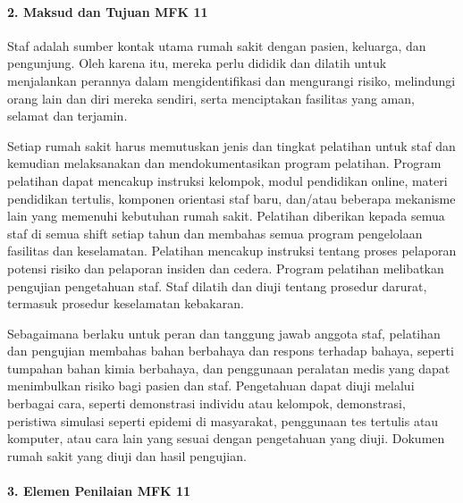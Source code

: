 \documentclass[
]{book}
\begin{document}
\hypertarget{maksud-dan-tujuan-mfk-11}{%
\paragraph*{2. Maksud dan Tujuan MFK 11}\label{maksud-dan-tujuan-mfk-11}}

Staf adalah sumber kontak utama rumah sakit dengan pasien, keluarga, dan pengunjung. Oleh karena itu, mereka perlu dididik dan dilatih untuk menjalankan perannya dalam mengidentifikasi dan mengurangi risiko, melindungi orang lain dan diri mereka sendiri, serta menciptakan fasilitas yang aman, selamat dan terjamin.

Setiap rumah sakit harus memutuskan jenis dan tingkat pelatihan untuk staf dan kemudian melaksanakan dan mendokumentasikan program pelatihan. Program pelatihan dapat mencakup instruksi kelompok, modul pendidikan online, materi pendidikan tertulis, komponen orientasi staf baru, dan/atau beberapa mekanisme lain yang memenuhi kebutuhan rumah sakit. Pelatihan diberikan kepada semua staf di semua shift setiap tahun dan membahas semua program pengelolaan fasilitas dan keselamatan. Pelatihan mencakup instruksi tentang proses pelaporan potensi risiko dan pelaporan insiden dan cedera. Program pelatihan melibatkan pengujian pengetahuan staf. Staf dilatih dan diuji tentang prosedur darurat, termasuk prosedur keselamatan kebakaran.

Sebagaimana berlaku untuk peran dan tanggung jawab anggota staf, pelatihan dan pengujian membahas bahan berbahaya dan respons terhadap bahaya, seperti tumpahan bahan kimia berbahaya, dan penggunaan peralatan medis yang dapat menimbulkan risiko bagi pasien dan staf. Pengetahuan dapat diuji melalui berbagai cara, seperti demonstrasi individu atau kelompok, demonstrasi, peristiwa simulasi seperti epidemi di masyarakat, penggunaan tes tertulis atau komputer, atau cara lain yang sesuai dengan pengetahuan yang diuji. Dokumen rumah sakit yang diuji dan hasil pengujian.

\hypertarget{elemen-penilaian-mfk-11}{%
\paragraph*{3. Elemen Penilaian MFK 11}\label{elemen-penilaian-mfk-11}}
\end{document}
